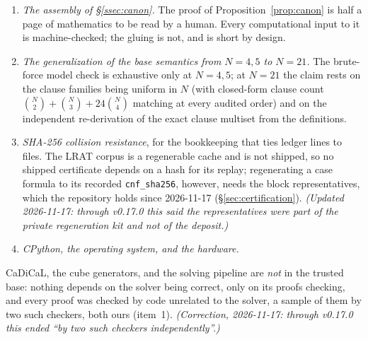 \documentclass[11pt]{amsart}
\theoremstyle{plain}
\theoremstyle{definition}
\theoremstyle{remark}
\begin{document}
\begin{enumerate}
Proposition~\ref{prop:blocks} from enumerations of their own; its controls
include a proof ending in an empty clause with no hints, which cake\_lpr
rejects. It did not run our checkers, and it does not machine-check the
short argument that the $346$ cases cover every graph (item~2 below). On
that record the unsatisfiability of each formula no longer rests on our
two checkers alone. The check is theirs and was not repeated here.
\emph{(Correction, 2026-11-17: through
v0.17.0 this item called the two checkers ``two independent
implementations'' and did not say that no established checker had been
run.)} \emph{(Addition, 2026-11-25: the sentences on the outside check of
2026-11-18.)}
\item \emph{The assembly of \S\ref{ssec:canon}.} The proof of
Proposition~\ref{prop:canon} is half a page of mathematics to be read by
a human. Every computational input to it is machine-checked; the gluing
is not, and is short by design.
\item \emph{The generalization of the base semantics from $N=4,5$ to
$N=21$.} The brute-force model check is exhaustive only at $N=4,5$; at
$N=21$ the claim rests on the clause families being uniform in $N$
(with closed-form clause count
$\binom{N}{2}+\binom{N}{3}+24\binom{N}{4}$ matching at every audited
order) and on the independent re-derivation of the exact clause
multiset from the definitions.
\item \emph{SHA-256 collision resistance}, for the bookkeeping that ties
ledger lines to files. The LRAT corpus is a regenerable cache and is not
shipped, so no shipped certificate depends on a hash for its replay; regenerating a case formula to its recorded
\texttt{cnf\_sha256}, however, needs the block representatives, which the
repository holds since 2026-11-17 (\S\ref{sec:certification}).
\emph{(Updated 2026-11-17: through v0.17.0 this said the representatives
were part of the private regeneration kit and not of the deposit.)}
\item \emph{CPython, the operating system, and the hardware.}
\end{enumerate}

\noindent CaDiCaL, the cube generators, and the solving pipeline are
\emph{not} in the trusted base: nothing depends on the solver being
correct, only on its proofs checking, and every proof was checked by
code unrelated to the solver, a sample of them by two such checkers, both
ours (item~1). \emph{(Correction, 2026-11-17: through v0.17.0 this ended
``by two such checkers independently''.)}
\end{document}
